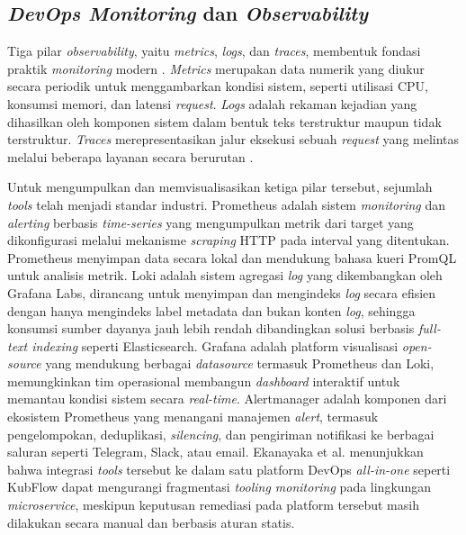 \subsection{\textit{DevOps Monitoring} dan \textit{Observability}}

Tiga pilar \textit{observability}, yaitu \textit{metrics}, \textit{logs}, dan \textit{traces}, membentuk fondasi praktik \textit{monitoring} modern \cite{trinity2023}. \textit{Metrics} merupakan data numerik yang diukur secara periodik untuk menggambarkan kondisi sistem, seperti utilisasi CPU, konsumsi memori, dan latensi \textit{request}. \textit{Logs} adalah rekaman kejadian yang dihasilkan oleh komponen sistem dalam bentuk teks terstruktur maupun tidak terstruktur. \textit{Traces} merepresentasikan jalur eksekusi sebuah \textit{request} yang melintas melalui beberapa layanan secara berurutan \cite{trinity2023}.

Untuk mengumpulkan dan memvisualisasikan ketiga pilar tersebut, sejumlah \textit{tools} telah menjadi standar industri. Prometheus adalah sistem \textit{monitoring} dan \textit{alerting} berbasis \textit{time-series} yang mengumpulkan metrik dari target yang dikonfigurasi melalui mekanisme \textit{scraping} HTTP pada interval yang ditentukan. Prometheus menyimpan data secara lokal dan mendukung bahasa kueri PromQL untuk analisis metrik. Loki adalah sistem agregasi \textit{log} yang dikembangkan oleh Grafana Labs, dirancang untuk menyimpan dan mengindeks \textit{log} secara efisien dengan hanya mengindeks label metadata dan bukan konten \textit{log}, sehingga konsumsi sumber dayanya jauh lebih rendah dibandingkan solusi berbasis \textit{full-text indexing} seperti Elasticsearch. Grafana adalah platform visualisasi \textit{open-source} yang mendukung berbagai \textit{datasource} termasuk Prometheus dan Loki, memungkinkan tim operasional membangun \textit{dashboard} interaktif untuk memantau kondisi sistem secara \textit{real-time}. Alertmanager adalah komponen dari ekosistem Prometheus yang menangani manajemen \textit{alert}, termasuk pengelompokan, deduplikasi, \textit{silencing}, dan pengiriman notifikasi ke berbagai saluran seperti Telegram, Slack, atau email. Ekanayaka et al. \cite{ekanayaka2023kubflow} menunjukkan bahwa integrasi \textit{tools} tersebut ke dalam satu platform DevOps \textit{all-in-one} seperti KubFlow dapat mengurangi fragmentasi \textit{tooling monitoring} pada lingkungan \textit{microservice}, meskipun keputusan remediasi pada platform tersebut masih dilakukan secara manual dan berbasis aturan statis.

